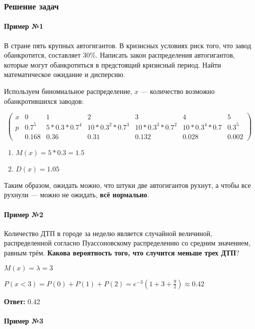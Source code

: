 \documentclass{article}
\begin{document}
\subsubsection{Решение задач}

\paragraph{Пример №1} В стране пять крупных автогигантов. В кризисных условиях риск того, что завод обанкротится, составляет 30\%. Написать закон распределения автогигантов, которые могут обанкротиться в предстоящий кризисный период. Найти математическое ожидание и дисперсию.

Используем биномиальное распределение, $x$ — количество возможно обанкротившихся заводов:

$$
\begin{pmatrix}
  x & 0 & 1 & 2 & 3 & 4 & 5 \\
  p & 0.7^5 & 5*0.3*0.7^4 & 10*0.3^2*0.7^3 & 10*0.3^3*0.7^2 & 10*0.3^4*0.7 & 0.3^5  \\
    & 0.168 & 0.36 & 0.31 & 0.132 & 0.028 & 0.002
\end{pmatrix}
$$

\begin{enumerate}
    \item $M(x) = 5 * 0.3 = 1.5$
    \item $D(x) = 1.05$
\end{enumerate}

Таким образом, ожидать можно, что штуки две автогигантов рухнут, а чтобы все рухнули — можно не ожидать, \textbf{всё нормально}.

\paragraph{Пример №2} Количество ДТП в городе за неделю является случайной величиной, распределенной согласно Пуассоновскому распределению со средним значением, равным трём. \textbf{Какова вероятность того, что случится меньше трех ДТП}?

$M(x) = \lambda = 3$

$P(x < 3) = P(0) + P(1) + P(2) = e^{-3} (1 + 3 + \frac{9}{2}) \approx 0.42$

\textbf{Ответ:} 0.42

\paragraph{Пример №3}
\end{document}
